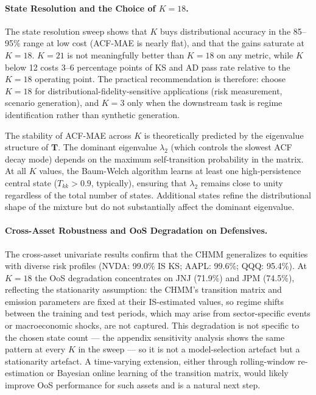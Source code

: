 \paragraph{State Resolution and the Choice of $K = 18$.}
The state resolution sweep shows that $K$ buys distributional accuracy in the 85--95\% range at low cost (ACF-MAE is nearly flat), and that the gains saturate at $K = 18$.
$K = 21$ is not meaningfully better than $K = 18$ on any metric, while $K$ below 12 costs 3--6 percentage points of KS and AD pass rate relative to the $K = 18$ operating point.
The practical recommendation is therefore: choose $K = 18$ for distributional-fidelity-sensitive applications (risk measurement, scenario generation), and $K = 3$ only when the downstream task is regime identification rather than synthetic generation.

The stability of ACF-MAE across $K$ is theoretically predicted by the eigenvalue structure of $\mathbf{T}$.
The dominant eigenvalue $\lambda_2$ (which controls the slowest ACF decay mode) depends on the maximum self-transition probability in the matrix.
At all $K$ values, the Baum-Welch algorithm learns at least one high-persistence central state ($T_{kk} > 0.9$, typically), ensuring that $\lambda_2$ remains close to unity regardless of the total number of states.
Additional states refine the distributional shape of the mixture but do not substantially affect the dominant eigenvalue.

\paragraph{Cross-Asset Robustness and OoS Degradation on Defensives.}
The cross-asset univariate results confirm that the CHMM generalizes to equities with diverse risk profiles (NVDA: 99.0\% IS KS; AAPL: 99.6\%; QQQ: 95.4\%).
At $K = 18$ the OoS degradation concentrates on JNJ (71.9\%) and JPM (74.5\%), reflecting the stationarity assumption: the CHMM's transition matrix and emission parameters are fixed at their IS-estimated values, so regime shifts between the training and test periods, which may arise from sector-specific events or macroeconomic shocks, are not captured.
This degradation is not specific to the chosen state count --- the appendix sensitivity analysis shows the same pattern at every $K$ in the sweep --- so it is not a model-selection artefact but a stationarity artefact.
A time-varying extension, either through rolling-window re-estimation or Bayesian online learning of the transition matrix, would likely improve OoS performance for such assets and is a natural next step.

